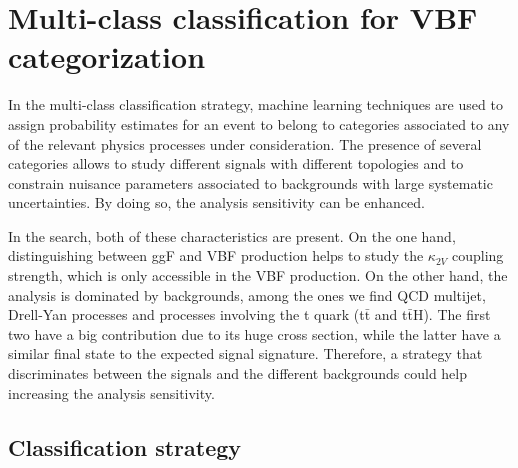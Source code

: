 \documentclass[../main.tex]{subfiles}
\begin{document}
\section{Multi-class classification  for VBF categorization}
\label{hh:sec:multiclass}

In the multi-class classification strategy, machine learning techniques are used to assign probability estimates for an event to belong to categories associated to any of the relevant physics processes under consideration.
The presence of several categories allows to study different signals with different topologies and to constrain nuisance parameters associated to backgrounds with large systematic uncertainties. By doing so, the analysis sensitivity can be enhanced.

In the \hhbbtt{} search, both of these characteristics are present. On the one hand, distinguishing between ggF and VBF production helps to study the $\kappa_{2V}$ coupling strength, which is only accessible in the VBF production. On the other hand, the analysis is dominated by backgrounds, among the ones we find QCD multijet, Drell-Yan processes and processes involving the t quark (t$\bar{\text{t}}$ and t$\bar{\text{t}}$H). The first two have a big contribution due to its huge cross section, while the latter have a similar final state to the expected signal signature. Therefore, a strategy that discriminates between the signals and the different backgrounds could help increasing the analysis sensitivity.


\subsection{Classification strategy}
\label{subs:hh:multi_class_strat}
\end{document}
